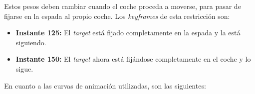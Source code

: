 \bigskip

Estos pesos deben cambiar cuando el coche proceda a moverse, para pasar de fijarse en la espada al propio coche. Los \textit{keyframes} de esta restricción son:

\begin{itemize}
    \item \textbf{Instante 125: }El \textit{target} está fijado completamente en la espada y la está siguiendo.
    \item \textbf{Instante 150: }El \textit{target} ahora está fijándose completamente en el coche y lo sigue.
\end{itemize}

\bigskip

\newpage

En cuanto a las curvas de animación utilizadas, son las siguientes:


